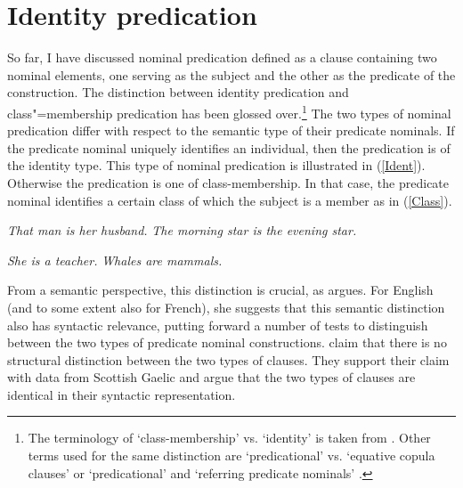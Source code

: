 \section{Identity predication}\label{Identity} 

So far, I have discussed nominal predication defined as a clause containing two nominal elements, one serving as the subject and the other as the predicate of the construction. 
The distinction between identity predication and class"=membership predication has been glossed over.\footnote{The terminology of  `class-membership' vs. `identity' is taken from \citet{Stassen:1997}. 
Other terms used for the same distinction are `predicational' vs. `equative copula clauses' \citep{Adger:2003} or `predicational' and `referring predicate nominals' \citep{Doron:1988}.}
The two types of nominal predication differ with respect to the semantic type of their predicate nominals. 
If the predicate nominal uniquely identifies an individual, then the predication is of the identity type. 
This type of nominal predication is illustrated in (\ref{Ident}). 
Otherwise the predication is one of class-membership. 
In that case, the predicate nominal identifies a certain class of which the subject is a member as in (\ref{Class}).

\begin{exe}\ex\label{Ident}
\begin{xlist}
\ex \textit{That man is her husband.}
\ex \textit{The morning star is the evening star.}
\end{xlist}
\end{exe}

\begin{exe}\ex\label{Class} 
\begin{xlist}\ex \textit{She is a teacher.}
\ex \textit{Whales are mammals. }
\end{xlist}
\end{exe}

From a semantic perspective, this distinction is crucial, as \citet{Doron:1988} argues. 
For English (and to some extent also for French), she suggests that this semantic distinction also has syntactic relevance, putting forward a number of tests to distinguish between the two types of predicate nominal constructions. 
\citet{Adger:2003} claim that there is no structural distinction between the two types of clauses. 
They support their claim with data from Scottish Gaelic and argue that the two types of clauses are identical in their syntactic representation.

